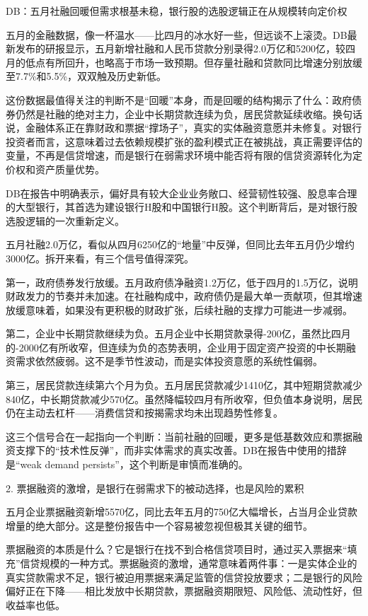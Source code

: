 \documentclass[11pt]{ctexart}
\begin{document}
DB：五月社融回暖但需求根基未稳，银行股的选股逻辑正在从规模转向定价权

五月的金融数据，像一杯温水——比四月的冰水好一些，但远谈不上滚烫。DB最新发布的研报显示，五月新增社融和人民币贷款分别录得2.0万亿和5200亿，较四月的低点有所回升，也略高于市场一致预期。但存量社融和贷款同比增速分别放缓至7.7\%和5.5\%，双双触及历史新低。

这份数据最值得关注的判断不是“回暖”本身，而是回暖的结构揭示了什么：政府债券仍然是社融的绝对主力，企业中长期贷款连续为负，居民贷款延续收缩。换句话说，金融体系正在靠财政和票据“撑场子”，真实的实体融资意愿并未修复。对银行投资者而言，这意味着过去依赖规模扩张的盈利模式正在被挑战，真正需要评估的变量，不再是信贷增速，而是银行在弱需求环境中能否将有限的信贷资源转化为定价权和资产质量优势。

DB在报告中明确表示，偏好具有较大企业业务敞口、经营韧性较强、股息率合理的大型银行，其首选为建设银行H股和中国银行H股。这个判断背后，是对银行股选股逻辑的一次重新定义。

五月社融2.0万亿，看似从四月6250亿的“地量”中反弹，但同比去年五月仍少增约3000亿。拆开来看，有三个信号值得深究。

第一，政府债券发行放缓。五月政府债净融资1.2万亿，低于四月的1.5万亿，说明财政发力的节奏并未加速。在社融构成中，政府债仍是最大单一贡献项，但其增速放缓意味着，如果没有更积极的财政扩张，后续社融的支撑力可能进一步减弱。

第二，企业中长期贷款继续为负。五月企业中长期贷款录得-200亿，虽然比四月的-2000亿有所收窄，但连续为负的态势表明，企业用于固定资产投资的中长期融资需求依然疲弱。这不是季节性波动，而是实体投资意愿的系统性偏弱。

第三，居民贷款连续第六个月为负。五月居民贷款减少1410亿，其中短期贷款减少840亿，中长期贷款减少570亿。虽然降幅较四月有所收窄，但负值本身说明，居民仍在主动去杠杆——消费信贷和按揭需求均未出现趋势性修复。

这三个信号合在一起指向一个判断：当前社融的回暖，更多是低基数效应和票据融资支撑下的“技术性反弹”，而非实体需求的真实改善。DB在报告中使用的措辞是“weak demand persists”，这个判断是审慎而准确的。

2. 票据融资的激增，是银行在弱需求下的被动选择，也是风险的累积

五月企业票据融资新增5570亿，同比去年五月的750亿大幅增长，占当月企业贷款增量的绝大部分。这是整份报告中一个容易被忽视但极其关键的细节。

票据融资的本质是什么？它是银行在找不到合格信贷项目时，通过买入票据来“填充”信贷规模的一种方式。票据融资的激增，通常意味着两件事：一是实体企业的真实贷款需求不足，银行被迫用票据来满足监管的信贷投放要求；二是银行的风险偏好正在下降——相比发放中长期贷款，票据融资期限短、风险低、流动性好，但收益率也低。
\end{document}
